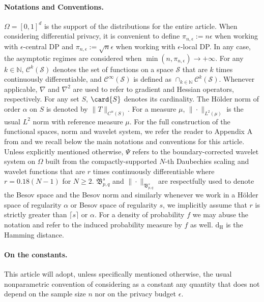 \documentclass{article}
\newcommand{\N}{\mathbb{N}}
\newcommand{\1}{\mathds{1}}
\newcommand{\ham}{\mathrm{d}_{\mathrm{H}}}
\theoremstyle{plain}
\theoremstyle{definition}
\theoremstyle{remark}
\begin{document}
\paragraph{Notations and Conventions.}

$\Omega = [0, 1]^d$ is the support of the distributions for the entire article. 
When considering differential privacy, it is convenient to define $\pi_{n, \epsilon} := n \epsilon$ when working with $\epsilon$-central DP and $\pi_{n, \epsilon} := \sqrt{n} \epsilon$ when working with $\epsilon$-local DP. In any case,
the asymptotic regimes are considered when $\min (n, \pi_{n, \epsilon} ) \rightarrow + \infty$. 
For any $k \in \N$, $\mathcal{C}^k(\mathcal{S})$ denotes the set of functions on a space $\mathcal{S}$ that are $k$ times continuously differentiable, and $\mathcal{C}^{\infty}(\mathcal{S})$ is defined as $\cap_{k \in \N} \mathcal{C}^k(\mathcal{S})$. 
Whenever applicable, $\nabla$ and $\nabla^2$ are used to refer to gradient and Hessian operators, respectively.
For any set $S$, $\card{S}$ denotes its cardinality. 
The Hölder norm of order $\alpha$ on $S$ is denoted by $\| T \|_{C^{\alpha}(S)}$. 
For a measure $\mu$, $\|  \cdot \|_{L^2(\mu)}$ is the usual $L^2$ norm with reference measure $\mu$. 
For the full construction of the functional spaces, norm and wavelet system, we refer the reader to Appendix A from \cite{Manole2024Plugin} and we recall below the main notations and conventions for this article.
Unless explicitly mentioned otherwise, $\Psi$ refers to the boundary-corrected wavelet system on $\Omega$ built from the compactly-supported $N$-th Daubechies scaling and wavelet functions that are $r$ times continuously differentiable where $r = 0.18(N - 1)$ for $N \geq 2$. $\mathfrak B^s_{p, q}$ and $\| \cdot \|_{\mathfrak B^s_{p, q}}$ are respectfully used to denote the Besov space  and the Besov norm and similarly whenever we work in a Hölder space of regularity $\alpha$ or Besov space of regularity $s$, we implicitly assume that $r$ is strictly greater than $\lceil s \rceil$ or $\alpha$. For a density of probability $f$ we may abuse the notation and refer to the induced probability measure by $f$ as well. $\ham$ is the Hamming distance.

\paragraph{On the constants.}
This article will adopt, unless specifically mentioned otherwise, the usual nonparametric convention of considering as a constant any quantity that does not depend on the sample size $n$ nor on the privacy budget $\epsilon$.
\end{document}
